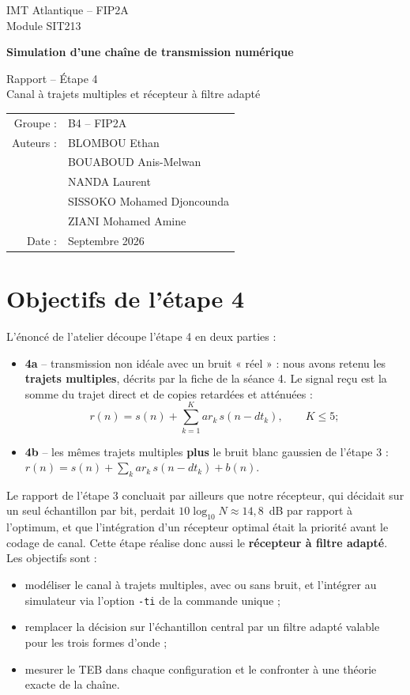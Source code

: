 \documentclass[11pt,a4paper]{article}
\begin{document}
\begin{titlepage}\centering
{\large IMT Atlantique -- FIP2A\\ Module SIT213\par}\vspace{3cm}
{\LARGE\bfseries Simulation d'une chaîne de transmission numérique\par}\vspace{0.6cm}
{\Large Rapport -- Étape 4\\[4pt]\normalsize Canal à trajets multiples et récepteur à filtre adapté\par}\vspace{2.5cm}
\begin{tabular}{rl}
Groupe : & B4 -- FIP2A\\[4pt]
Auteurs : & BLOMBOU Ethan\\ & BOUABOUD Anis-Melwan\\ & NANDA Laurent\\ & SISSOKO Mohamed Djoncounda\\ & ZIANI Mohamed Amine\\[4pt]
Date : & Septembre 2026
\end{tabular}\vfill
\end{titlepage}
\tableofcontents\newpage

\section{Objectifs de l'étape 4}
L'énoncé de l'atelier découpe l'étape 4 en deux parties :
\begin{itemize}
  \item \textbf{4a} -- transmission non idéale avec un bruit « réel » : nous avons retenu les \textbf{trajets multiples}, décrits par la fiche de la séance 4. Le signal reçu est la somme du trajet direct et de copies retardées et atténuées :
  \[ r(n) = s(n) + \sum_{k=1}^{K} ar_k\, s(n - dt_k), \qquad K \le 5 ; \]
  \item \textbf{4b} -- les mêmes trajets multiples \textbf{plus} le bruit blanc gaussien de l'étape 3 : $r(n) = s(n) + \sum_k ar_k\,s(n-dt_k) + b(n)$.
\end{itemize}
Le rapport de l'étape 3 concluait par ailleurs que notre récepteur, qui décidait sur un seul échantillon par bit, perdait $10\log_{10}N \approx 14{,}8$~dB par rapport à l'optimum, et que l'intégration d'un récepteur optimal était la priorité avant le codage de canal. Cette étape réalise donc aussi le \textbf{récepteur à filtre adapté}. Les objectifs sont :
\begin{itemize}
  \item modéliser le canal à trajets multiples, avec ou sans bruit, et l'intégrer au simulateur via l'option \texttt{-ti} de la commande unique ;
  \item remplacer la décision sur l'échantillon central par un filtre adapté valable pour les trois formes d'onde ;
  \item mesurer le TEB dans chaque configuration et le confronter à une théorie exacte de la chaîne.
\end{itemize}
\end{document}
